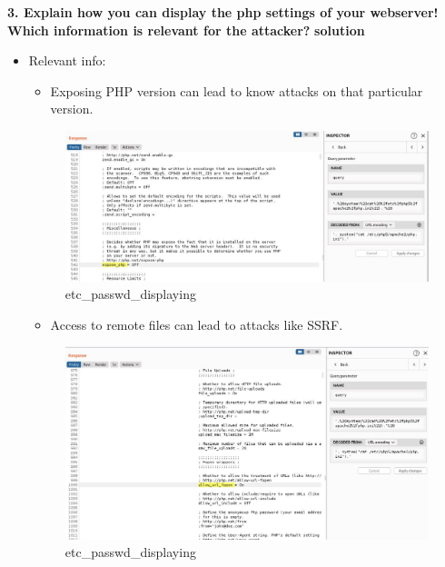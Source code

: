\textbf{3. Explain how you can display the php settings of your
webserver! Which information is relevant for the attacker?}
\textbf{solution}

\begin{itemize}
\item
  Relevant info:

  \begin{itemize}
  \tightlist
  \item
    Exposing PHP version can lead to know attacks on that particular
    version.
  \end{itemize}

  \begin{figure}
  \centering
  \includegraphics{images/task2/PHPV.JPG}
  \caption{etc\_passwd\_displaying}
  \end{figure}

  \begin{itemize}
  \tightlist
  \item
    Access to remote files can lead to attacks like SSRF.
  \end{itemize}

  \begin{figure}
  \centering
  \includegraphics{images/task2/PHPV1.JPG}
  \caption{etc\_passwd\_displaying}
  \end{figure}


\end{itemize}
